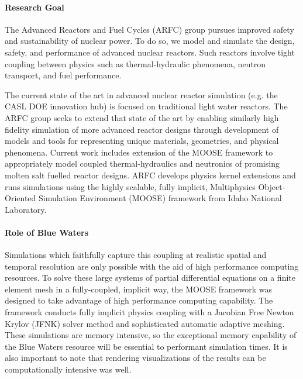 \documentclass[11pt]{article}
\newcommand{\authorname}{Kathryn~D.~Huff }
\newcommand{\authorsite}{katyhuff.github.com}
\begin{document}
\pagestyle{fancy}
\lhead{\textcolor{gray}{\it \authorname}}
\rhead{\textcolor{gray}{\thepage}}
\renewcommand{\headrulewidth}{0pt}
\renewcommand{\footrulewidth}{0pt}
\fancyfoot[C]{\footnotesize \textcolor{gray}{\authorsite}}

\paragraph{Research Goal}

The Advanced Reactors and Fuel Cycles (ARFC) group pursues improved safety and
sustainability of nuclear power. To do so, we model and
simulate the design, safety, and performance of advanced nuclear reactors.
Such reactors  involve tight coupling between physics such as thermal-hydraulic
phenomena, neutron transport, and fuel performance.

The current state of the art in advanced nuclear reactor simulation (e.g. the
CASL DOE innovation hub) is focused on traditional light water reactors.
The ARFC group seeks to extend that state of the art by enabling similarly high fidelity simulation of more advanced reactor designs through development of models and tools for representing unique materials, geometries, and physical phenomena. Current work includes extension
of the MOOSE framework to appropriately model coupled thermal-hydraulics and
neutronics of promising molten salt fuelled reactor designs.
ARFC develops physics kernel extensions and runs simulations using the highly
scalable, fully implicit, Multiphysics Object-Oriented Simulation Environment
(MOOSE) framework from Idaho National Laboratory.


\paragraph{Role of Blue Waters}
Simulations which faithfully capture this coupling at realistic spatial and
temporal resolution are only possible with the aid of high performance
computing resources.  To solve these large systems of partial differential
equations on a finite element mesh in a fully-coupled, implicit way, the MOOSE
framework was designed to take advantage of high performance computing
capability.  The framework conducts fully implicit physics coupling with a
Jacobian Free Newton Krylov (JFNK) solver method and sophisticated automatic
adaptive meshing.  These simulations are memory intensive, so the exceptional
memory capability of the Blue Waters resource will be essential to performant
simulation times. It is also important to note that rendering visualizations of
the results can be computationally intensive was well.
\end{document}
